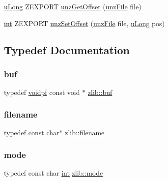\begin{DoxyCompactItemize}
\item 
\hyperlink{namespacezlib_a3bc0123d9337acd75d286df79e6cf7da}{u\+Long} Z\+E\+X\+P\+O\+RT \hyperlink{namespacezlib_a0a1cdabde1d4c3e15a1a3fe74ad6316e}{unz\+Get\+Offset} (\hyperlink{namespacezlib_a48c1eb530e72d2132ea9cb6648f4047e}{unz\+File} file)
\item 
\hyperlink{namespacezlib_a0c9da18d93722fcf02a354ae2b6ec1ba}{int} Z\+E\+X\+P\+O\+RT \hyperlink{namespacezlib_a576a94727964ae455a95b4565eb7c543}{unz\+Set\+Offset} (\hyperlink{namespacezlib_a48c1eb530e72d2132ea9cb6648f4047e}{unz\+File} file, \hyperlink{namespacezlib_a3bc0123d9337acd75d286df79e6cf7da}{u\+Long} pos)
\end{DoxyCompactItemize}


\subsection{Typedef Documentation}
\mbox{\label{namespacezlib_a500d53d2dafa1e8390dc41cc14dd5553}} 
\subsubsection{\texorpdfstring{buf}{buf}}
{\footnotesize\ttfamily typedef \hyperlink{namespacezlib_a2bc9778594c329ce309c43185bc3f9eb}{voidpf} const void $\ast$ \hyperlink{namespacezlib_a500d53d2dafa1e8390dc41cc14dd5553}{zlib\+::buf}}

\mbox{\label{namespacezlib_ac9e8acdeb11e8fa9e3f373572b6d4a9f}} 
\subsubsection{\texorpdfstring{filename}{filename}}
{\footnotesize\ttfamily typedef const char$\ast$ \hyperlink{namespacezlib_ac9e8acdeb11e8fa9e3f373572b6d4a9f}{zlib\+::filename}}

\mbox{\label{namespacezlib_a86cbc9a4e23f2f76a5589cb2e090ea6e}} 
\subsubsection{\texorpdfstring{mode}{mode}}
{\footnotesize\ttfamily typedef const char \hyperlink{namespacezlib_a0c9da18d93722fcf02a354ae2b6ec1ba}{int} \hyperlink{namespacezlib_a86cbc9a4e23f2f76a5589cb2e090ea6e}{zlib\+::mode}}

